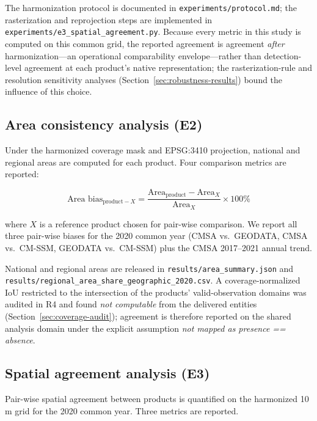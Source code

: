 \documentclass[11pt]{article}
\begin{document}
The harmonization protocol is documented in \texttt{experiments/protocol.md};
the rasterization and reprojection steps are implemented in
\texttt{experiments/e3\_spatial\_agreement.py}. Because every metric in this
study is computed on this common grid, the reported agreement is agreement
\emph{after} harmonization---an operational comparability envelope---rather
than detection-level agreement at each product's native representation; the
rasterization-rule and resolution sensitivity analyses
(Section~\ref{sec:robustness-results}) bound the influence of this choice.

\subsection{Area consistency analysis (E2)}

Under the harmonized coverage mask and EPSG:3410 projection, national and
regional areas are computed for each product. Four comparison metrics are
reported:

\begin{equation}
\text{Area bias}_{\text{product}-X} =
\frac{\text{Area}_{\text{product}} - \text{Area}_X}{\text{Area}_X} \times 100\%
\label{eq:bias}
\end{equation}

where $X$ is a reference product chosen for pair-wise comparison. We report
all three pair-wise biases for the 2020 common year (CMSA vs.\ GEODATA, CMSA vs.\
CM-SSM, GEODATA vs.\ CM-SSM) plus the CMSA 2017--2021 annual trend.

National and regional areas are released in \texttt{results/area\_summary.json}
and \texttt{results/regional\_area\_share\_geographic\_2020.csv}. A
coverage-normalized IoU restricted to the intersection of the products'
valid-observation domains was audited in R4 and found \emph{not computable}
from the delivered entities (Section~\ref{sec:coverage-audit}); agreement is
therefore reported on the shared analysis domain under the explicit
assumption \emph{not mapped as presence == absence}.

\subsection{Spatial agreement analysis (E3)}

Pair-wise spatial agreement between products is quantified on the harmonized
10\,m grid for the 2020 common year. Three metrics are reported.
\end{document}
